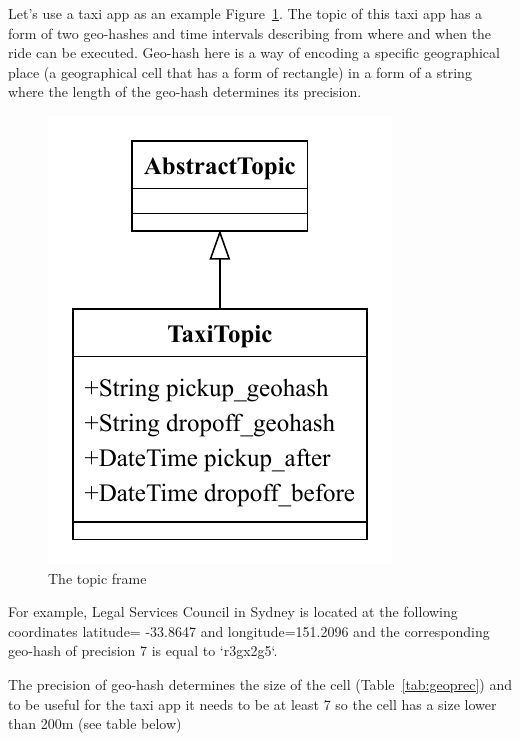 \documentclass{article}
\begin{document}
Let's use a taxi app as an example {Figure~\ref{fig:fr:topic}}. The topic of this taxi app has a form of two geo-hashes and time intervals describing from where and when the ride can be executed. Geo-hash here is a way of encoding a specific geographical place (a geographical cell that has a form of rectangle) in a form of a string where the length of the geo-hash determines its precision.

\begin{figure}
	\centering
	\includegraphics[scale=0.7]{Topic.pdf}
	\caption{The topic frame}
	\label{fig:fr:topic}
\end{figure}


For example, Legal Services Council in Sydney is located at the following coordinates latitude= -33.8647 and longitude=151.2096 and the corresponding geo-hash of precision 7 is equal to `r3gx2g5`.

The precision of geo-hash determines the size of the cell (Table~\ref{tab:geoprec}) and to be useful for the taxi app it needs to be at least 7 so the cell has a size lower than 200m (see table below)
\end{document}
